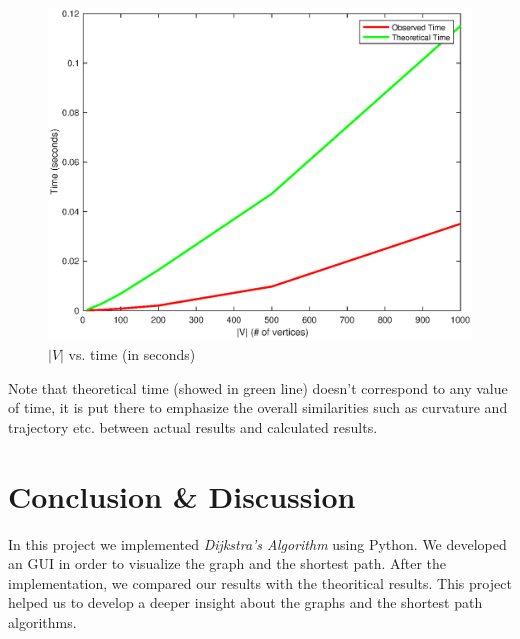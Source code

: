 \documentclass[twocolumns]{IEEEtran}
\begin{document}
	\begin{figure}
		\centering
		\includegraphics[scale=.4]{matlab/time_2.eps}
		\caption{$|V|$ vs. time (in seconds)}
	\end{figure}

	Note that theoretical time (showed in green line) doesn't correspond to any value of time, it is put there to emphasize the overall similarities such as curvature and trajectory etc. between actual results and calculated results.
	

	\section{Conclusion \& Discussion}
	In this project we implemented \textit{Dijkstra's Algorithm} using Python. We developed an GUI in order to visualize the graph and the shortest path. After the implementation, we compared our results with the theoritical results. This project helped us to develop a deeper insight about the graphs and the shortest path algorithms.

	
	
\end{document}
